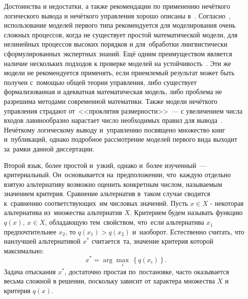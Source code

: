 \begin{figure}[h!]
\end{figure}

Достоинства и недостатки, а также рекомендации по применению нечёткого логического вывода и нечёткого управления хорошо описаны в~\cite{Bauer_Winkler, Grinyaev_Computerra}. Согласно~\cite{Bauer_Winkler, Pavlov_Sokolov}, использование моделей первого типа рекомендуется для моделирования очень сложных процессов, когда не существует простой математической модели, для нелинейных процессов высоких порядков и для~обработки лингвистически сформулированных экспертных знаний. Ещё одним преимуществом является наличие нескольких подходов к проверке моделей на устойчивость~\cite{Pegat, Uskov_Kruglov}. Эти же модели не рекомендуется применять, если приемлемый результат может быть получен с~помощью общей теории управления, либо существует формализованная и адекватная математическая модель, либо проблема не разрешима методами современной математики. Также модели нечёткого управления страдают от~<<проклятия размерности>>~--- с увеличением числа входов лавинообразно нарастает число необходимых правил для вывода~\cite{Pegat, Fuller}. Нечёткому логическому выводу и~управлению посвящено множество книг и~публикаций, однако подробное рассмотрение моделей первого вида выходит за~рамки данной диссертации.

Второй язык, более простой и~узкий, однако и~более изученный~--- критериальный. Он~основывается на~предположении, что~каждую отдельно взятую альтернативу возможно оценить конкретным числом, называемым значением критерия. Сравнение альтернатив в~таком случае сводится к~сравнению соответствующих~им числовых значений. Пусть $x\in X$ - некоторая альтернатива из~множества альтернатив $X$. Критерием будем называть функцию $q\left( x \right),\ x\in X$, обладающую тем~свойством, что~если альтернатива ${x_1}$ предпочтительнее ${x_2}$, то $q\left( x_1 \right)>q\left( x_2 \right)$ и~наоборот. Естественно считать, что наилучшей альтернативой ${{x}^{*}}$ считается~та, значение критерия которой максимально:
\begin{equation*}
  x^{*}=\arg \underset{i}{\mathop{\max }}\,\left\{ q\left( x_i \right) \right\}.
\end{equation*}
Задача отыскания $x^{*}$, достаточно простая по~постановке, часто оказывается весьма сложной в решении, поскольку зависит от характера множества $X$ и критерия $q\left( x \right)$. 


